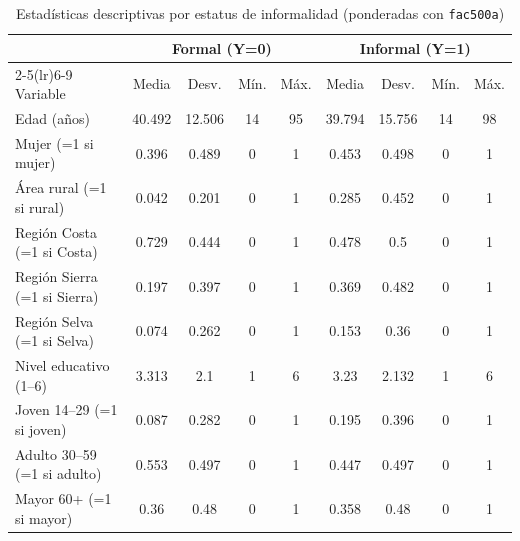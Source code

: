 \begin{table}[htbp]
\centering
\caption{Estadísticas descriptivas por estatus de informalidad (ponderadas con \texttt{fac500a})}
\label{tab:descriptivas}
\begin{tabular}{lcccccccc}
\hline\hline
 & \multicolumn{4}{c}{Formal (Y=0)} & \multicolumn{4}{c}{Informal (Y=1)} \\
\cmidrule(lr){2-5}\cmidrule(lr){6-9}
Variable & Media & Desv. & Mín. & Máx. & Media & Desv. & Mín. & Máx. \\
\hline
Edad (años) & 40.492 & 12.506 & 14 & 95 & 39.794 & 15.756 & 14 & 98 \\
Mujer (=1 si mujer) & 0.396 & 0.489 & 0 & 1 & 0.453 & 0.498 & 0 & 1 \\
Área rural (=1 si rural) & 0.042 & 0.201 & 0 & 1 & 0.285 & 0.452 & 0 & 1 \\
Región Costa (=1 si Costa) & 0.729 & 0.444 & 0 & 1 & 0.478 & 0.5 & 0 & 1 \\
Región Sierra (=1 si Sierra) & 0.197 & 0.397 & 0 & 1 & 0.369 & 0.482 & 0 & 1 \\
Región Selva (=1 si Selva) & 0.074 & 0.262 & 0 & 1 & 0.153 & 0.36 & 0 & 1 \\
Nivel educativo (1–6) & 3.313 & 2.1 & 1 & 6 & 3.23 & 2.132 & 1 & 6 \\
Joven 14–29 (=1 si joven) & 0.087 & 0.282 & 0 & 1 & 0.195 & 0.396 & 0 & 1 \\
Adulto 30–59 (=1 si adulto) & 0.553 & 0.497 & 0 & 1 & 0.447 & 0.497 & 0 & 1 \\
Mayor 60+ (=1 si mayor) & 0.36 & 0.48 & 0 & 1 & 0.358 & 0.48 & 0 & 1 \\
\hline\hline
\end{tabular}
\end{table}